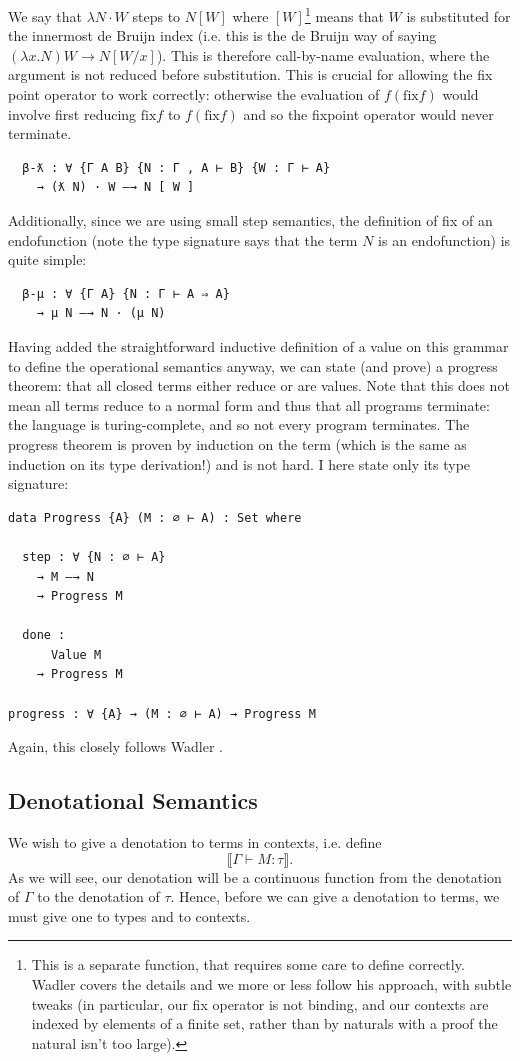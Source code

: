 \documentclass[12pt,a4paper,twoside,openright]{report}
\begin{document}
We say that $\lambda N \cdot W$ steps to $N [W]$ where $[W]$\footnote{This is a separate function, that requires some care to define correctly. Wadler \cite{PLFA} covers the details and we more or less follow his approach, with subtle tweaks (in particular, our fix operator is not binding, and our contexts are indexed by elements of a finite set, rather than by naturals with a proof the natural isn't too large).} means that $W$ is substituted for the innermost de Bruijn index (i.e. this is the de Bruijn way of saying $(\lambda x. N) W \to N[W/x]$). This is therefore call-by-name evaluation, where the argument is not reduced before substitution. This is crucial for allowing the fix point operator to work correctly: otherwise the evaluation of $f (\text{fix} f)$ would involve first reducing $\text{fix} f$ to $f (\text{fix} f)$ and so the fixpoint operator would never terminate. 
\begin{verbatim}
  β-ƛ : ∀ {Γ A B} {N : Γ , A ⊢ B} {W : Γ ⊢ A}
    → (ƛ N) · W —→ N [ W ]
\end{verbatim}
Additionally, since we are using small step semantics, the definition of fix of an endofunction (note the type signature says that the term $N$ is an endofunction) is quite simple:
\begin{verbatim}
  β-μ : ∀ {Γ A} {N : Γ ⊢ A ⇒ A}
    → μ N —→ N · (μ N)
\end{verbatim}

Having added the straightforward inductive definition of a value on this grammar to define the operational semantics anyway, we can state (and prove) a progress theorem: that all closed terms either reduce or are values. Note that this does not mean all terms reduce to a normal form and thus that all programs terminate: the language is turing-complete, and so not every program terminates. The progress theorem is proven by induction on the term (which is the same as induction on its type derivation!) and is not hard. I here state only its type signature:
\begin{verbatim}
data Progress {A} (M : ∅ ⊢ A) : Set where

  step : ∀ {N : ∅ ⊢ A}
    → M —→ N
    → Progress M

  done :
      Value M
    → Progress M

progress : ∀ {A} → (M : ∅ ⊢ A) → Progress M
\end{verbatim}
Again, this closely follows Wadler \cite{PLFA}. 
\subsection{Denotational Semantics}
We wish to give a denotation to terms in contexts, i.e. define 
\[
\llbracket \Gamma \vdash M : \tau \rrbracket.
\]
As we will see, our denotation will be a continuous function from the denotation of $\Gamma$ to the denotation of $\tau$. Hence, before we can give a denotation to terms, we must give one to types and to contexts. 
\end{document}
